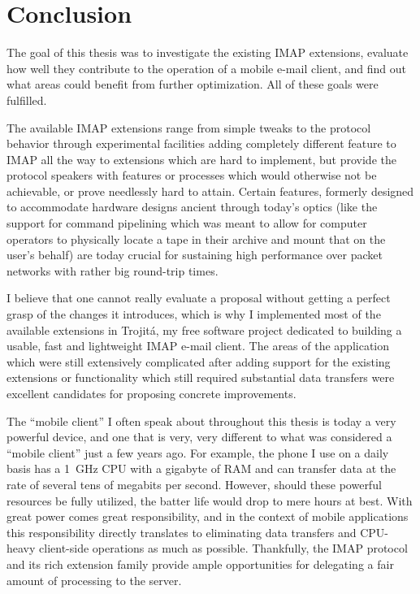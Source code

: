 \documentclass[trojita]{subfiles}
\begin{document}
\chapter{Conclusion}
\label{sec:conclusion}

The goal of this thesis was to investigate the existing IMAP extensions, evaluate how well they contribute to the
operation of a mobile e-mail client, and find out what areas could benefit from further optimization.  All of these
goals were fulfilled.

The available IMAP extensions range from simple tweaks to the protocol behavior through experimental facilities adding
completely different feature to IMAP all the way to extensions which are hard to implement, but provide the protocol
speakers with features or processes which would otherwise not be achievable, or prove needlessly hard to attain.
Certain features, formerly designed to accommodate hardware designs ancient through today's optics (like the support for
command pipelining which was meant to allow for computer operators to physically locate a tape in their archive and
mount that on the user's behalf) are today crucial for sustaining high performance over packet networks with rather big
round-trip times.

I believe that one cannot really evaluate a proposal without getting a perfect grasp of the changes it introduces, which
is why I implemented most of the available extensions in Trojitá, my free software project dedicated to building a
usable, fast and lightweight IMAP e-mail client.  The areas of the application which were still extensively complicated
after adding support for the existing extensions or functionality which still required substantial data transfers were
excellent candidates for proposing concrete improvements.

The ``mobile client'' I often speak about throughout this thesis is today a very powerful device, and one that is very,
very different to what was considered a ``mobile client'' just a few years ago.  For example, the phone I use on a daily
basis has a 1~GHz CPU with a gigabyte of RAM and can transfer data at the rate of several tens of megabits per second.
However, should these powerful resources be fully utilized, the batter life would drop to mere hours at best.  With
great power comes great responsibility, and in the context of mobile applications this responsibility directly
translates to eliminating data transfers and CPU-heavy client-side operations as much as possible.  Thankfully, the IMAP
protocol and its rich extension family provide ample opportunities for delegating a fair amount of processing to the
server.
\end{document}
